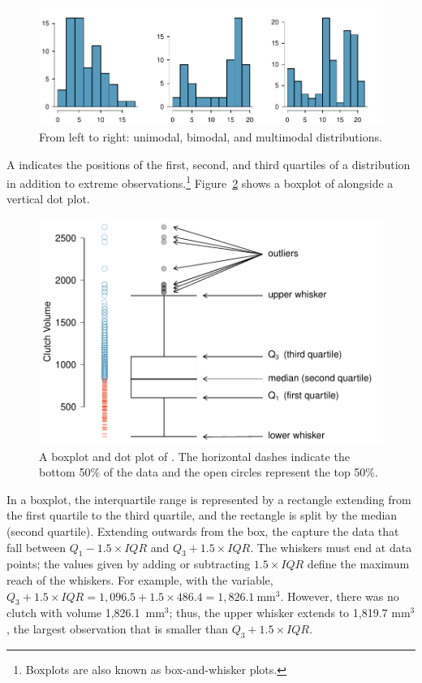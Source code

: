 \begin{figure}[h]
	\centering
	\includegraphics[width=\textwidth]{ch_intro_to_data_oi_biostat/figures/singleBiMultiModalPlots/singleBiMultiModalPlots}
	\caption{From left to right: unimodal, bimodal, and multimodal distributions.}
	\label{singleBiMultiModalPlots}
\end{figure}

A  indicates the positions of the first, second, and third quartiles of a distribution in addition to extreme observations.\footnote{Boxplots are also known as box-and-whisker plots.} Figure~\ref{frogBoxPlot} shows a boxplot of  alongside a vertical dot plot.

\begin{figure}[th]
	\centering
	\includegraphics[width=0.86\mycaptionwidth]{ch_intro_to_data_oi_biostat/figures/frogBoxPlot/frogBoxPlot}
	\caption{A boxplot and dot plot of . The horizontal dashes indicate the bottom 50\% of the data and the open circles represent the top 50\%.}
	\label{frogBoxPlot}
\end{figure}

In a boxplot, the interquartile range is represented by a rectangle extending from the first quartile to the third quartile, and the rectangle is split by the median (second quartile). Extending outwards from the box, the  capture the data that fall between $Q_1 - 1.5\times IQR$ and $Q_3 + 1.5\times IQR$. The whiskers must end at data points; the values given by adding or subtracting $1.5\times IQR$ define the maximum reach of the whiskers. For example, with the  variable, $Q_3 + 1.5 \times IQR = 1,096.5 + 1.5\times 486.4 = 1,826.1\ \textrm {mm}^{3}$. However, there was no clutch with volume 1,826.1\ $\textrm {mm}^{3}$; thus, the upper whisker extends to 1,819.7 $\textrm {mm}^{3}$, the largest observation that is smaller than $Q_3 + 1.5\times IQR$.

